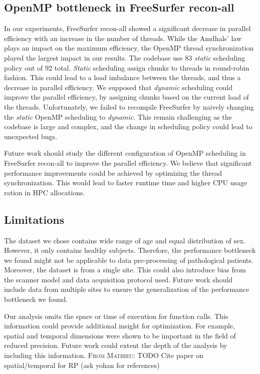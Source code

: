 \documentclass[conference]{IEEEtran}
\newcommand{\MD}[1]{\color{magenta}\textsc{From Mathieu: }#1\color{black}}
\begin{document}
\subsection{OpenMP bottleneck in FreeSurfer recon-all}
In our experiments, FreeSurfer recon-all showed a significant decrease in parallel efficiency with an increase in the number of threads. While the Amdhals' law plays an impact on the maximum efficiency, the OpenMP thread synchronization played the largest impact in our results. The codebase use 83 \textit{static} scheduling policy out of 92 total. \textit{Static} scheduling assign chunks to threads in round-robin fashion. This could lead to a load imbalance between the threads, and thus a decrease in parallel efficiency. We supposed that \textit{dynamic} scheduling could improve the parallel efficiency, by assigning chunks based on the current load of the threads. Unfortunately, we failed to recompile FreeSurfer by naively changing the \textit{static} OpenMP scheduling to \textit{dynamic}. This remain challenging as the codebase is large and complex, and the change in scheduling policy could lead to unexpected bugs.
			
Future work should study the different configuration of OpenMP scheduling in FreeSurfer recon-all to improve the parallel efficiency. We believe that significant performance improvements could be achieved by optimizing the thread synchronization. This would lead to faster runtime time and higher CPU usage ration in HPC allocations.
			
\subsection{Limitations}
The dataset we chose contains wide range of age and equal distribution of sex. However, it only contains healthy subjects. Therefore, the performance bottleneck we found might not be applicable to data pre-processing of pathological patients. Moreover, the dataset is from a single site. This could also introduce bias from the scanner model and data acquisition protocol used. Future work should include data from multiple sites to ensure the generalization of the performance bottleneck we found.
			
Our analysis omits the space or time of execution for function calls. This information could provide additional insight for optimization. For example, spatial and temporal dimensions were shown to be important in the field of reduced precision. Future work could extent the depth of the analysis by including this information.
\MD{TODO Cite paper on spatial/temporal for RP (ask yohan for references)}
			
\end{document}
